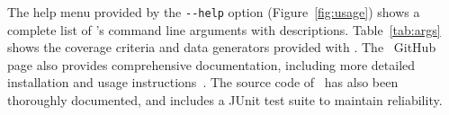 The help menu provided by the \lstinline{--help} option (Figure~\ref{fig:usage}) shows a complete list of \sa's command
line arguments with descriptions. Table~\ref{tab:args} shows the coverage criteria and data generators provided with
\sa. The \sa~GitHub page also provides comprehensive documentation, including more detailed installation and usage
instructions~\cite{tool}. The source code of \sa~has also been thoroughly documented, and includes a JUnit test suite to
maintain reliability.

